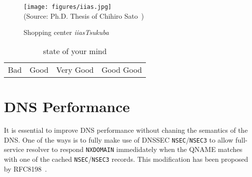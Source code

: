 \begin{figure}[htbp]
\begin{center}
 \texttt{[image: figures/iias.jpg]}\\
 {\scriptsize (Source: Ph.D. Thesis of Chihiro Sato~\cite{chihiro2014})}
\end{center}                 
  \caption{Shopping center {\itshape iiasTsukuba}}
  \label{fig:iias}
\end{figure}


\begin{table}[ht]
\caption{state of your mind}
\label{cluster_category}
\centering
\small
\begin{tabu} to \linewidth {|c|c|c|c|}
\hline
 &
 &
 &
\\
\hline
Bad & Good & Very Good & Good Good\\
\hline
\end{tabu}
\end{table}

\section{DNS Performance}

It is essential to improve DNS performance without chaning the semantics
of the DNS. One of the ways is to fully make use of DNSSEC
{\tt NSEC}/{\tt NSEC3} to allow full-service resolver
to respond {\tt NXDOMAIN} immedidately
when the QNAME matches with one of the cached {\tt NSEC}/{\tt NSEC3} records.
This modification has been proposed by RFC8198~\cite{rfc8198}.

\putendnotes

